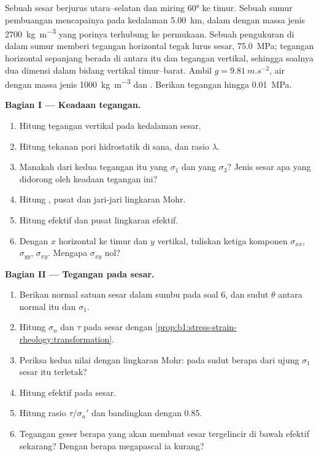 \begin{problem}
\label{pb:b1:stress-strain-rheology:1}
Sebuah sesar berjurus utara--selatan dan miring \ang{60} ke timur. Sebuah sumur pembuangan mencapainya pada kedalaman \qty{5.00}{km}, dalam  dengan massa jenis \qty{2700}{kg.m^{-3}} yang porinya terhubung ke permukaan. Sebuah pengukuran di dalam sumur memberi tegangan horizontal tegak lurus sesar, \qty{75.0}{MPa}; tegangan horizontal sepanjang  berada di antara itu dan tegangan vertikal, sehingga soalnya dua dimensi dalam bidang vertikal timur--barat. Ambil $g = \qty{9.81}{m.s^{-2}}$, air dengan massa jenis \qty{1000}{kg.m^{-3}} dan . Berikan tegangan hingga \qty{0.01}{MPa}.

\medskip
\noindent\textbf{Bagian I --- Keadaan tegangan.}
\begin{enumerate}
  \item Hitung tegangan vertikal pada kedalaman sesar.
  \item Hitung tekanan pori hidrostatik di sana, dan rasio $\lambda$.
  \item Manakah dari kedua tegangan itu yang $\sigma_1$ dan yang $\sigma_3$? Jenis sesar apa yang didorong oleh keadaan tegangan ini?
  \item Hitung , pusat dan jari-jari lingkaran Mohr.
  \item Hitung  efektif dan pusat lingkaran efektif.
  \item Dengan $x$ horizontal ke timur dan $y$ vertikal, tuliskan ketiga komponen $\sigma_{xx}$, $\sigma_{yy}$, $\sigma_{xy}$. Mengapa $\sigma_{xy}$ nol?
\end{enumerate}

\medskip
\noindent\textbf{Bagian II --- Tegangan pada sesar.}
\begin{enumerate}[resume]
  \item Berikan normal satuan sesar dalam sumbu pada soal 6, dan sudut $\theta$ antara normal itu dan $\sigma_1$.
  \item Hitung $\sigma_n$ dan $\tau$ pada sesar dengan \cref{prop:b1:stress-strain-rheology:transformation}.
  \item Periksa kedua nilai dengan lingkaran Mohr: pada sudut berapa dari ujung $\sigma_1$ sesar itu terletak?
  \item Hitung  efektif pada sesar.
  \item Hitung rasio $\tau/\sigma_n'$ dan bandingkan dengan 0.85.
  \item Tegangan geser berapa yang akan membuat sesar tergelincir di bawah  efektif sekarang? Dengan berapa megapascal ia kurang?
\end{enumerate}


\end{problem}
